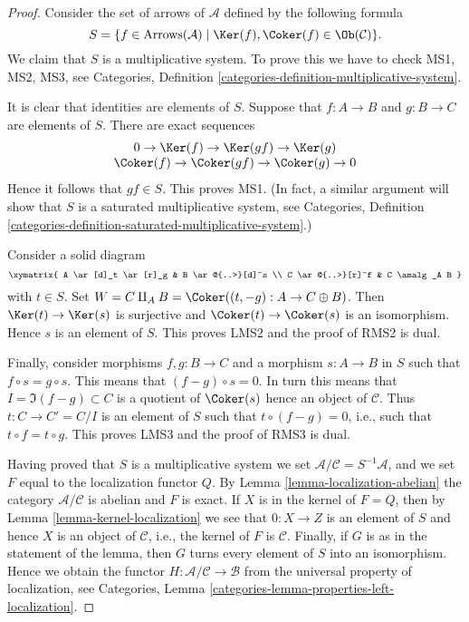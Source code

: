 \begin{proof}
Consider the set of arrows of $\mathcal{A}$ defined by
the following formula
$$
S = \{f \in \text{Arrows}(\mathcal{A}) \mid
\Ker(f), \Coker(f) \in \Ob(\mathcal{C}) \}.
$$
We claim that $S$ is a multiplicative system. To prove this we have
to check MS1, MS2, MS3, see
Categories, Definition \ref{categories-definition-multiplicative-system}.

\medskip\noindent
It is clear that identities are elements of $S$. Suppose that
$f : A \to B$ and $g : B \to C$ are elements of $S$.
There are exact sequences
$$
\begin{matrix}
0 \to \Ker(f) \to \Ker(gf) \to \Ker(g) \\
\Coker(f) \to \Coker(gf) \to \Coker(g) \to 0
\end{matrix}
$$
Hence it follows that $gf \in S$. This proves MS1. (In fact, a similar
argument will show that $S$ is a saturated multiplicative system, see
Categories, Definition
\ref{categories-definition-saturated-multiplicative-system}.)

\medskip\noindent
Consider a solid diagram
$$
\xymatrix{
A \ar[d]_t \ar[r]_g & B \ar@{..>}[d]^s \\
C \ar@{..>}[r]^f & C \amalg_A B
}
$$
with $t \in S$. Set
$W = C \amalg_A B =  \Coker((t, -g) : A \to C \oplus B)$.
Then $\Ker(t) \to \Ker(s)$ is surjective and
$\Coker(t) \to \Coker(s)$ is an isomorphism. Hence
$s$ is an element of $S$. This proves LMS2 and the proof of RMS2 is dual.

\medskip\noindent
Finally, consider morphisms $f, g : B \to C$ and a morphism $s : A \to B$
in $S$ such that $f \circ s = g \circ s$. This means that
$(f - g) \circ s = 0$. In turn this means that
$I = \Im(f - g) \subset C$ is a quotient of $\Coker(s)$
hence an object of $\mathcal{C}$. Thus $t : C \to C' = C/I$ is an
element of $S$ such that $t \circ (f - g) = 0$, i.e., such that
$t \circ f = t \circ g$. This proves LMS3 and the proof of
RMS3 is dual.

\medskip\noindent
Having proved that $S$ is a multiplicative system we set
$\mathcal{A}/\mathcal{C} = S^{-1}\mathcal{A}$, and we set
$F$ equal to the localization functor $Q$. By
Lemma \ref{lemma-localization-abelian}
the category $\mathcal{A}/\mathcal{C}$ is abelian and $F$ is exact.
If $X$ is in the kernel of $F = Q$, then by
Lemma \ref{lemma-kernel-localization}
we see that $0 : X \to Z$ is an element of $S$ and hence
$X$ is an object of $\mathcal{C}$, i.e., the kernel of
$F$ is $\mathcal{C}$.
Finally, if $G$ is as in the statement of the lemma, then $G$ turns
every element of $S$ into an isomorphism. Hence we obtain the
functor $H : \mathcal{A}/\mathcal{C} \to \mathcal{B}$ from
the universal property of localization, see
Categories, Lemma \ref{categories-lemma-properties-left-localization}.
\end{proof}

